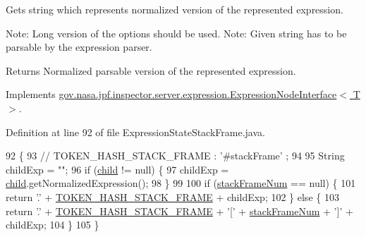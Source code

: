 Gets string which represents normalized version of the represented expression. 

Note\+: Long version of the options should be used. Note\+: Given string has to be parsable by the expression parser.

\begin{DoxyReturn}{Returns}
Normalized parsable version of the represented expression. 
\end{DoxyReturn}


Implements \hyperlink{interfacegov_1_1nasa_1_1jpf_1_1inspector_1_1server_1_1expression_1_1_expression_node_interface_ae5387d8da0126c1256a786d54b9bd7ce}{gov.\+nasa.\+jpf.\+inspector.\+server.\+expression.\+Expression\+Node\+Interface$<$ T $>$}.



Definition at line 92 of file Expression\+State\+Stack\+Frame.\+java.


\begin{DoxyCode}
92                                            \{
93     \textcolor{comment}{// TOKEN\_HASH\_STACK\_FRAME : '#stackFrame' ;}
94 
95     String childExp = \textcolor{stringliteral}{""};
96     \textcolor{keywordflow}{if} (\hyperlink{classgov_1_1nasa_1_1jpf_1_1inspector_1_1server_1_1expression_1_1_expression_state_unary_operator_a66041b1f569a361549e28a00f7ca5f2f}{child} != null) \{
97       childExp = \hyperlink{classgov_1_1nasa_1_1jpf_1_1inspector_1_1server_1_1expression_1_1_expression_state_unary_operator_a66041b1f569a361549e28a00f7ca5f2f}{child}.getNormalizedExpression();
98     \}
99 
100     \textcolor{keywordflow}{if} (\hyperlink{classgov_1_1nasa_1_1jpf_1_1inspector_1_1server_1_1expression_1_1expressions_1_1_expression_state_stack_frame_a8d86ca98d313121576886938dba7c40a}{stackFrameNum} == null) \{
101       \textcolor{keywordflow}{return} \textcolor{charliteral}{'.'} + \hyperlink{classgov_1_1nasa_1_1jpf_1_1inspector_1_1server_1_1expression_1_1expressions_1_1_expression_state_stack_frame_abff298afbd878c93c5d648cc32338bcb}{TOKEN\_HASH\_STACK\_FRAME} + childExp;
102     \} \textcolor{keywordflow}{else} \{
103       \textcolor{keywordflow}{return} \textcolor{charliteral}{'.'} + \hyperlink{classgov_1_1nasa_1_1jpf_1_1inspector_1_1server_1_1expression_1_1expressions_1_1_expression_state_stack_frame_abff298afbd878c93c5d648cc32338bcb}{TOKEN\_HASH\_STACK\_FRAME} + \textcolor{charliteral}{'['} + 
      \hyperlink{classgov_1_1nasa_1_1jpf_1_1inspector_1_1server_1_1expression_1_1expressions_1_1_expression_state_stack_frame_a8d86ca98d313121576886938dba7c40a}{stackFrameNum} + \textcolor{charliteral}{']'} + childExp;
104     \}
105   \}
\end{DoxyCode}
